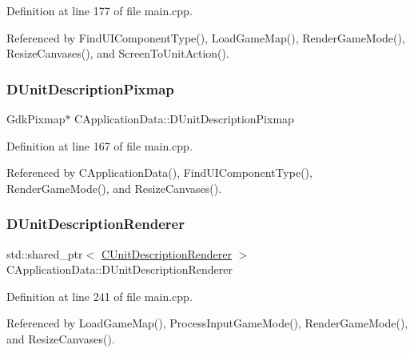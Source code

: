 Definition at line 177 of file main.\+cpp.



Referenced by Find\+U\+I\+Component\+Type(), Load\+Game\+Map(), Render\+Game\+Mode(), Resize\+Canvases(), and Screen\+To\+Unit\+Action().

\hypertarget{classCApplicationData_a52e5c1a2ac452c82580ba3f4978c3501}{}\label{classCApplicationData_a52e5c1a2ac452c82580ba3f4978c3501} 
\subsubsection{\texorpdfstring{D\+Unit\+Description\+Pixmap}{DUnitDescriptionPixmap}}
{\footnotesize\ttfamily Gdk\+Pixmap$\ast$ C\+Application\+Data\+::\+D\+Unit\+Description\+Pixmap\hspace{0.3cm}{\ttfamily [protected]}}



Definition at line 167 of file main.\+cpp.



Referenced by C\+Application\+Data(), Find\+U\+I\+Component\+Type(), Render\+Game\+Mode(), and Resize\+Canvases().

\hypertarget{classCApplicationData_a194301f34566fc497b032bdfcad55287}{}\label{classCApplicationData_a194301f34566fc497b032bdfcad55287} 
\subsubsection{\texorpdfstring{D\+Unit\+Description\+Renderer}{DUnitDescriptionRenderer}}
{\footnotesize\ttfamily std\+::shared\+\_\+ptr$<$ \hyperlink{classCUnitDescriptionRenderer}{C\+Unit\+Description\+Renderer} $>$ C\+Application\+Data\+::\+D\+Unit\+Description\+Renderer\hspace{0.3cm}{\ttfamily [protected]}}



Definition at line 241 of file main.\+cpp.



Referenced by Load\+Game\+Map(), Process\+Input\+Game\+Mode(), Render\+Game\+Mode(), and Resize\+Canvases().

